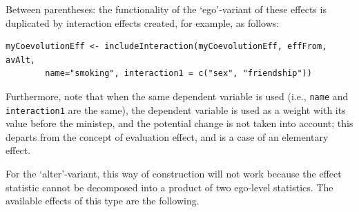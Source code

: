 \documentclass[a4paper,fleqn,11pt]{article}
\newcommand{\+}{\, + \,}
\begin{document}
Between parentheses: the functionality of the `ego'-variant of these effects is duplicated by
interaction effects created, for example, as follows:
\begin{verbatim}
myCoevolutionEff <- includeInteraction(myCoevolutionEff, effFrom, avAlt,
        name="smoking", interaction1 = c("sex", "friendship"))
\end{verbatim}
Furthermore, note that when the same dependent variable is used
(i.e., \texttt{name} and \texttt{interaction1} are the same),
the dependent variable is used as a weight with its value
before the ministep, and the potential change is not taken into account;
this departs from the concept of evaluation effect,
and is a case of an elementary effect.

For the `alter'-variant, this way of construction will not work because the
effect statistic cannot be decomposed into a product of two ego-level statistics.
The available effects of this type are the following.
\end{document}
